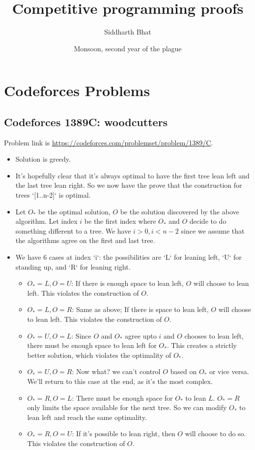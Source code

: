 \documentclass[14pt]{report}
\title{Competitive programming proofs}
\author{Siddharth Bhat}
\date{Monsoon, second year of the plague}
\begin{document}
\maketitle
\tableofcontents

\chapter{Codeforces Problems}

\section{Codeforces 1389C: woodcutters}
Problem link is \url{https://codeforces.com/problemset/problem/1389/C}.
\begin{itemize}
\item Solution is greedy.
\item It's hopefully clear that it's always optimal to have the
    first tree lean left and the last tree lean right.  So we now
    have the prove that the construction for trees `[1..n-2]` is
    optimal.

\item Let $O_*$ be the optimal solution, $O$ be the solution discovered by the
    above algorithm.  Let index $i$ be the first index where $O_*$ and $O$
        decide to do something different to a tree.  We have $i > 0, i < n-2$
        since we assume that the algorithms agree on the first and last tree.
\item We have  6 cases at index `i`: the possibilities are `L` for leaning left, `U` for standing up, and `R` for leaning right.
\begin{itemize}
\item  $O_*=L, O=U$: If there is enough space to lean left, $O$ will choose to
    lean left. This violates the construction of $O$.
\item  $O_*=L, O=R$: Same as above; If there is space to lean left, $O$ will
    choose to lean left. This violates the construction of $O$.
\item  $O_*=U, O=L$: Since $O$ and $O_*$ agree upto $i$ and $O$ chooses to lean
    left, there must be enough space to lean left for $O_*$. This creates a
        strictly better solution,  which violates the optimality of $O_*$.
\item $O_*=U, O=R$: Now what? we can't control $O$ based on $O_*$ or vice
    versa.  We'll return to this case at the end, as it's the most complex.
\item $O_*=R, O=L$: There must be enough space for $O_*$ to lean $L$. $O_*=R$
    only limits the space available for the next tree. So we can modify $O_*$
        to lean left and reach the same optimality.
\item $O_*=R, O=U$: If it's possible to lean right, then $O$ will choose to do
    so. This violates the construction of $O$.
\end{itemize}


\end{itemize}
\end{document}
